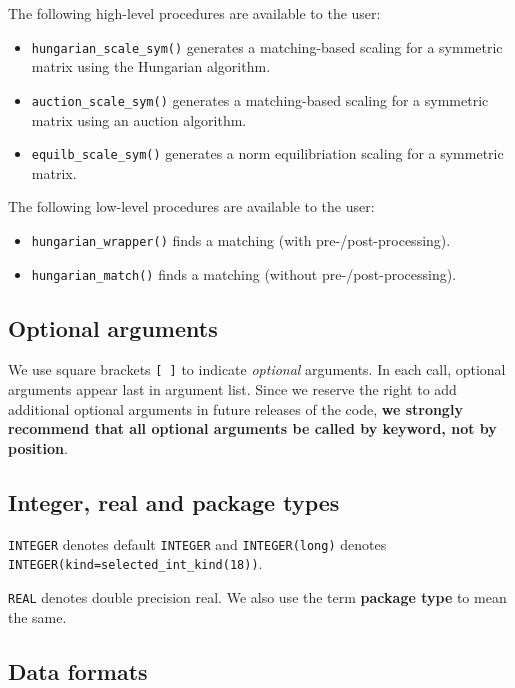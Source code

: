 \medskip

\noindent
The following high-level procedures are available to the user:
\begin{itemize}
\item {\tt hungarian\_scale\_sym()} generates a matching-based scaling for a symmetric matrix using the Hungarian algorithm.
\item {\tt auction\_scale\_sym()} generates a matching-based scaling for a symmetric matrix using an auction algorithm.
\item {\tt equilb\_scale\_sym()} generates a norm equilibriation scaling for a symmetric matrix.
\end{itemize}
The following low-level procedures are available to the user:
\begin{itemize}
   \item {\tt hungarian\_wrapper()} finds a matching (with pre-/post-processing).
   \item {\tt hungarian\_match()} finds a matching (without pre-/post-processing).
\end{itemize}

\subsection{Optional arguments}\label{Optional arguments}

We use square brackets {\tt [ ]} to indicate {\it optional} arguments.
In each
call, optional arguments appear last in argument list.  Since we
reserve the right to add additional optional arguments in future
releases of the code, {\bf we strongly recommend that all optional
arguments be called by keyword, not by position}.

\subsection{Integer, real and package types}\label{Integer kinds}

{\tt INTEGER} denotes default {\tt INTEGER} and
{\tt INTEGER(long)} denotes {\tt INTEGER(kind=selected\_int\_kind(18))}.

\noindent
{\tt REAL} denotes double precision real.
We also use the term {\bf package type} to mean the same.

\subsection{Data formats} \label{dataformats}

